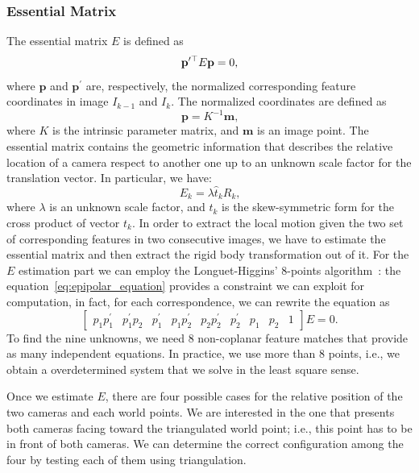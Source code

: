 \subsubsection{Essential Matrix}
\label{subsec:essential_matrix}
The essential matrix $E$ is defined as
%
\begin{equation}
\label{eq:epipolar_equation}
	\mathbf{p}^{\prime\top} E \mathbf{p} = 0 \text{,}
\end{equation}
%
\noindent where $\mathbf{p}$ and $\mathbf{p}^\prime$ are, respectively, the normalized corresponding 
feature coordinates in image $I_{k-1}$ and $I_{k}$. The normalized coordinates are defined as
%
\begin{equation}
	\mathbf{p} = K^{-1} \mathbf{m} \text{,}
\end{equation}
%
\noindent where $K$ is the intrinsic parameter matrix, and $\mathbf{m}$ is an
image point.
The essential matrix contains the geometric information that describes the 
relative location of a camera respect to another one up to an unknown scale factor 
for the translation vector. In particular, we have:
\begin{equation*}
	E_k = \lambda \hat{t}_kR_k \text{,}
\end{equation*}
\noindent where $\lambda$ is an unknown scale factor, and $\hat{t}_k$ is 
the skew-symmetric form for the cross product of vector $t_k$.
In order to extract the local motion given the two set of corresponding features
in two consecutive images, we have to estimate the essential matrix and then 
extract the rigid body transformation out of it.
For the $E$ estimation part we can employ the Longuet-Higgins' 8-points 
algorithm~\cite{longuet1981computer}: the equation~\ref{eq:epipolar_equation} 
provides a constraint we
can exploit for computation, in fact, for each correspondence, we can rewrite 
the equation as
%
\begin{equation*}
	\begin{bmatrix}
		p_1p^\prime_1 & 
        p^\prime_1p_2 & 
        p^\prime_1 & 
        p_1p^\prime_2 & 
        p_2p^\prime_2 & 
        p^\prime_2 & 
        p_1 & p_2 & 
        1
	\end{bmatrix}
	E = 0	\text{.}
\end{equation*}
%
To find the nine unknowns, we need 8 non-coplanar feature matches that provide as many 
independent equations. In practice, we use more than 8 points, i.e., we obtain a overdetermined 
system that we solve in the least square sense.

Once we estimate $E$, there are four possible cases for the relative 
position of the two cameras and each world points. We are interested in the one
that presents both cameras facing toward the triangulated world point; i.e., this point has to be in front of both cameras. We can determine the correct configuration among the four by testing each of them using triangulation.

